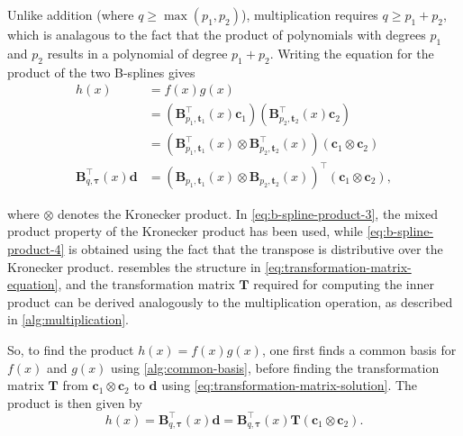 Unlike addition (where $q \geq \max(p_1, p_2)$), multiplication requires $q \ge p_1 + p_2$, which is analagous to the fact that the product of polynomials with degrees $p_1$ and $p_2$ results in a polynomial of degree $p_1 + p_2$.
Writing the equation for the product of the two B-splines gives
\begin{subequations}\label{eq:b-spline-product}
    \begin{align}
        h(x) &= f(x) g(x) \label{eq:b-spline-product-1} \\
        &= \left(\mathbf{B}_{p_1, \mathbf{t}_1}^{\top}(x) \mathbf{c}_1\right) 
        \left(\mathbf{B}_{p_2, \mathbf{t}_2}^{\top}(x) \mathbf{c}_2\right) \label{eq:b-spline-product-2} \\
        &= \left(\mathbf{B}_{p_1, \mathbf{t}_1}^{\top}(x) \otimes \mathbf{B}_{p_2, \mathbf{t}_2}^{\top}(x)\right) 
        \left(\mathbf{c}_1 \otimes \mathbf{c}_2\right) \label{eq:b-spline-product-3} \\
        \mathbf{B}_{q, \boldsymbol{\tau}}^{\top}(x) \mathbf{d} 
        &= \left(\mathbf{B}_{p_1, \mathbf{t}_1}(x) \otimes \mathbf{B}_{p_2, \mathbf{t}_2}(x)\right)^{\top} \left(\mathbf{c}_1 \otimes \mathbf{c}_2\right), \label{eq:b-spline-product-4}
    \end{align}
\end{subequations}

where $\otimes$ denotes the Kronecker product. In \cref{eq:b-spline-product-3}, the mixed product property of the Kronecker product has been used, while \cref{eq:b-spline-product-4} is obtained using the fact that the transpose is distributive over the Kronecker product.  resembles the structure in \cref{eq:transformation-matrix-equation}, and the transformation matrix $\mathbf T$ required for computing the inner product can be derived analogously to the multiplication operation, as described in \cref{alg:multiplication}.

So, to find the product $h(x) = f(x) g(x)$, one first finds a common basis for $f(x)$ and $g(x)$ using \cref{alg:common-basis}, before finding the transformation matrix $\mathbf T$ from $\mathbf c_1 \otimes \mathbf c_2$ to $\mathbf d$ using \cref{eq:transformation-matrix-solution}. The product is then given by
\begin{equation}
    h(x) = \mathbf B_{q, \boldsymbol{\tau}}^\top(x) \mathbf d = \mathbf B_{q, \boldsymbol{\tau}}^\top(x) \mathbf T (\mathbf c_1 \otimes \mathbf c_2).
\end{equation}

